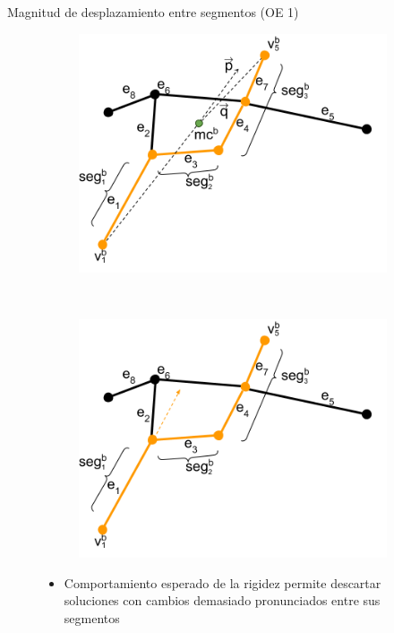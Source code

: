 \begin{frame}{Magnitud de desplazamiento entre segmentos (OE 1)}
    \begin{figure}[h]
    \centering
    \begin{subfigure}[t]{0.45\textwidth}
        \centering
        \includegraphics[scale=0.4]{Pictures/ant_segmentMagnitude_case.png}
    \end{subfigure}
    ~ \hspace{0.5cm}
    \begin{subfigure}[t]{0.45\textwidth}
        \centering
        \includegraphics[scale=0.4]{Pictures/ant_segmentMagnitude_case_2.png}
    \end{subfigure}%
    \begin{itemize}
        \item Comportamiento esperado de la rigidez permite descartar soluciones con cambios demasiado pronunciados entre sus segmentos
    \end{itemize}
\end{figure}
\end{frame}

